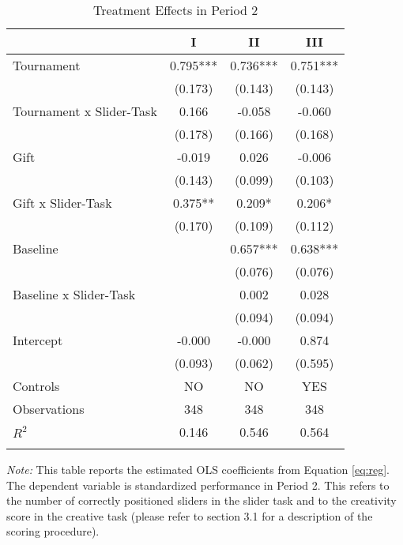 \begin{table}[h]%
\setlength\tabcolsep{2pt}
\caption{Treatment Effects in Period 2}
\begin{center}%
{\small\renewcommand{\arraystretch}{1}%
\begin{tabular}{lccc}
\hline\hline\noalign{\smallskip}
 & I & II & III \\
\hline\noalign{\smallskip}
Tournament          &       0.795***&       0.736***&       0.751***\\
                    &     (0.173)   &     (0.143)   &     (0.143)   \\[2mm]
Tournament x Slider-Task&       0.166   &      -0.058   &      -0.060   \\
                    &     (0.178)   &     (0.166)   &     (0.168)   \\[2mm]
Gift                &      -0.019   &       0.026   &      -0.006   \\
                    &     (0.143)   &     (0.099)   &     (0.103)   \\[2mm]
Gift x Slider-Task  &       0.375** &       0.209*  &       0.206*  \\
                    &     (0.170)   &     (0.109)   &     (0.112)   \\[2mm]
Baseline            &               &       0.657***&       0.638***\\
                    &               &     (0.076)   &     (0.076)   \\[2mm]
Baseline x Slider-Task&               &       0.002   &       0.028   \\
                    &               &     (0.094)   &     (0.094)   \\[2mm]
Intercept           &      -0.000   &      -0.000   &       0.874   \\
                    &     (0.093)   &     (0.062)   &     (0.595)   \\[2mm]
\noalign{\smallskip}\hline
 Controls & NO & NO & YES \\
\hline
Observations        &         348   &         348   &         348   \\
$R^2$               &       0.146   &       0.546   &       0.564   \\
\hline\hline\noalign{\medskip}
\end{tabular}
\begin{minipage}{\textwidth}
\footnotesize {\it Note:} This table reports the estimated OLS coefficients from Equation \ref{eq:reg}. 
The dependent variable is standardized performance in Period 2. This refers to the number of correctly positioned sliders in the slider task and to the creativity score in the creative task (please refer to section 3.1 for a description of the scoring procedure). 

\end{minipage}}
\end{center}
\end{table}
